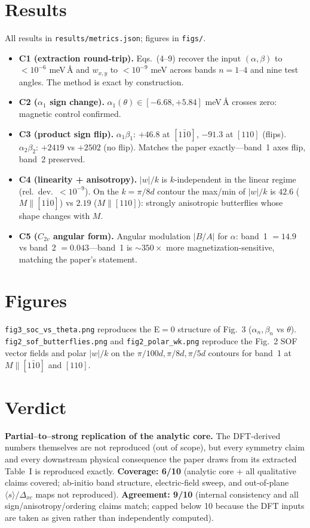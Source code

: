 \documentclass[aps,prl,twocolumn,superscriptaddress]{revtex4-2}
\begin{document}
\section{Results}
All results in \texttt{results/metrics.json}; figures in \texttt{figs/}.
\begin{itemize}
\item \textbf{C1 (extraction round-trip).} Eqs.~(4--9) recover the input
$(\alpha,\beta)$ to $<10^{-6}$ meV\,\AA{} and $w_{x,y}$ to $<10^{-9}$ meV across
bands $n{=}1$--$4$ and nine test angles. The method is exact by construction.
\item \textbf{C2 ($\alpha_1$ sign change).} $\alpha_1(\theta)\in[-6.68,+5.84]$
meV\,\AA{} crosses zero: magnetic control confirmed.
\item \textbf{C3 (product sign flip).} $\alpha_1\beta_1$: $+46.8$ at
$[1\bar10]$, $-91.3$ at $[110]$ (flips). $\alpha_2\beta_2$: $+2419$ vs $+2502$
(no flip). Matches the paper exactly---band~1 axes flip, band~2 preserved.
\item \textbf{C4 (linearity + anisotropy).} $|w|/k$ is $k$-independent in the
linear regime (rel.\ dev.\ $<10^{-9}$). On the $k=\pi/8d$ contour the max/min
of $|w|/k$ is $42.6$ ($M\parallel[1\bar10]$) vs $2.19$ ($M\parallel[110]$):
strongly anisotropic butterflies whose shape changes with $M$.
\item \textbf{C5 ($C_{2v}$ angular form).} Angular modulation $|B/A|$ for
$\alpha$: band~1 $=14.9$ vs band~2 $=0.043$---band~1 is $\sim350\times$ more
magnetization-sensitive, matching the paper's statement.
\end{itemize}

\section{Figures}
\texttt{fig3\_soc\_vs\_theta.png} reproduces the E$=0$ structure of Fig.~3
($\alpha_n,\beta_n$ vs $\theta$). \texttt{fig2\_sof\_butterflies.png} and
\texttt{fig2\_polar\_wk.png} reproduce the Fig.~2 SOF vector fields and polar
$|w|/k$ on the $\pi/100d,\pi/8d,\pi/5d$ contours for band~1 at
$M\parallel[1\bar10]$ and $[110]$.

\section{Verdict}
\textbf{Partial--to--strong replication of the analytic core.} The DFT-derived
numbers themselves are not reproduced (out of scope), but every symmetry claim
and every downstream physical consequence the paper draws from its extracted
Table~I is reproduced exactly. \textbf{Coverage: 6/10} (analytic core + all
qualitative claims covered; ab-initio band structure, electric-field sweep, and
out-of-plane $\langle s\rangle/\Delta_{xc}$ maps not reproduced).
\textbf{Agreement: 9/10} (internal consistency and all sign/anisotropy/ordering
claims match; capped below 10 because the DFT inputs are taken as given rather
than independently computed).
\end{document}
